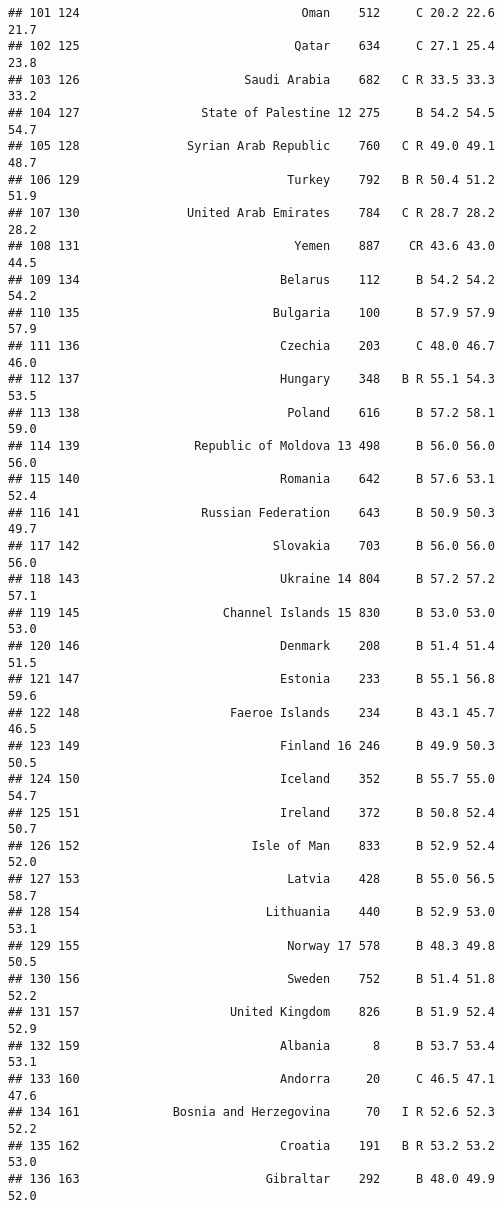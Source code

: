 \documentclass[]{article}
\begin{document}
\begin{verbatim}
## 101 124                               Oman    512     C 20.2 22.6 21.7
## 102 125                              Qatar    634     C 27.1 25.4 23.8
## 103 126                       Saudi Arabia    682   C R 33.5 33.3 33.2
## 104 127                 State of Palestine 12 275     B 54.2 54.5 54.7
## 105 128               Syrian Arab Republic    760   C R 49.0 49.1 48.7
## 106 129                             Turkey    792   B R 50.4 51.2 51.9
## 107 130               United Arab Emirates    784   C R 28.7 28.2 28.2
## 108 131                              Yemen    887    CR 43.6 43.0 44.5
## 109 134                            Belarus    112     B 54.2 54.2 54.2
## 110 135                           Bulgaria    100     B 57.9 57.9 57.9
## 111 136                            Czechia    203     C 48.0 46.7 46.0
## 112 137                            Hungary    348   B R 55.1 54.3 53.5
## 113 138                             Poland    616     B 57.2 58.1 59.0
## 114 139                Republic of Moldova 13 498     B 56.0 56.0 56.0
## 115 140                            Romania    642     B 57.6 53.1 52.4
## 116 141                 Russian Federation    643     B 50.9 50.3 49.7
## 117 142                           Slovakia    703     B 56.0 56.0 56.0
## 118 143                            Ukraine 14 804     B 57.2 57.2 57.1
## 119 145                    Channel Islands 15 830     B 53.0 53.0 53.0
## 120 146                            Denmark    208     B 51.4 51.4 51.5
## 121 147                            Estonia    233     B 55.1 56.8 59.6
## 122 148                     Faeroe Islands    234     B 43.1 45.7 46.5
## 123 149                            Finland 16 246     B 49.9 50.3 50.5
## 124 150                            Iceland    352     B 55.7 55.0 54.7
## 125 151                            Ireland    372     B 50.8 52.4 50.7
## 126 152                        Isle of Man    833     B 52.9 52.4 52.0
## 127 153                             Latvia    428     B 55.0 56.5 58.7
## 128 154                          Lithuania    440     B 52.9 53.0 53.1
## 129 155                             Norway 17 578     B 48.3 49.8 50.5
## 130 156                             Sweden    752     B 51.4 51.8 52.2
## 131 157                     United Kingdom    826     B 51.9 52.4 52.9
## 132 159                            Albania      8     B 53.7 53.4 53.1
## 133 160                            Andorra     20     C 46.5 47.1 47.6
## 134 161             Bosnia and Herzegovina     70   I R 52.6 52.3 52.2
## 135 162                            Croatia    191   B R 53.2 53.2 53.0
## 136 163                          Gibraltar    292     B 48.0 49.9 52.0

\end{verbatim}
\end{document}
